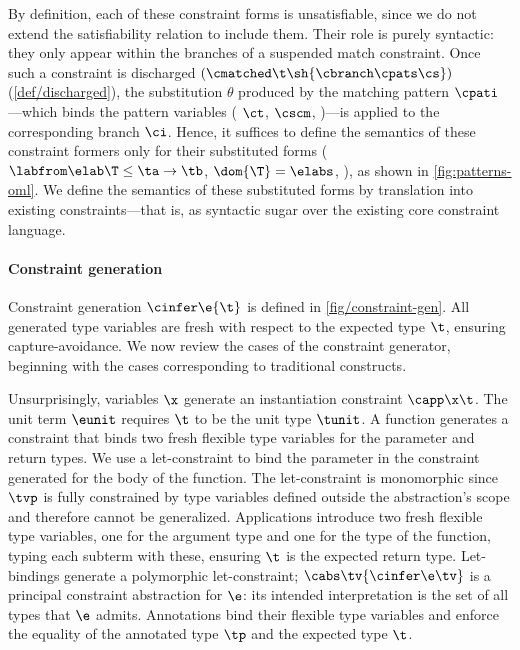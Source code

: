 \documentclass[acmsmall,screen,nonacm%
\Anonymous{,anonymous}{}%
\Final{}{,review}%
]{acmart}
\begin{document}
By definition, each of these constraint forms is unsatisfiable, since we do not
extend the satisfiability relation to include them. Their role is purely
syntactic: they only appear within the branches of a suspended match
constraint. Once such a constraint is discharged $(\cmatched \t \sh {\cbranch
\cpats \cs})$ (\cref {def/discharged}), the substitution $\theta$ produced by
the matching pattern $\cpati$---which binds the pattern variables (\eg
$\ct$, $\cscm$, \etc)---is
applied to the corresponding branch $\ci$. Hence, it suffices to define
the semantics of these constraint formers only for their substituted forms (\eg
$\labfrom \elab \T \leq \ta \to \tb$, $\dom {\T} = \elabs$, \etc), as shown in
\cref{fig:patterns-oml}. We define the semantics of these substituted forms by
translation into existing constraints---that is, as syntactic sugar over the
existing core constraint language.

\paragraph{Constraint generation}

Constraint generation $\cinfer \e {\mathop{\t}}$ is defined in
\cref{fig/constraint-gen}. All generated type variables are fresh with respect
to the expected type $\t$, ensuring capture-avoidance. We now review the cases
of the constraint generator, beginning with the cases corresponding to
traditional \ML constructs.


Unsurprisingly, variables $\x$ generate an instantiation constraint $\capp \x
\t$. The unit term $\eunit$ requires $\t$ to be the unit type $\tunit$. A
function generates a constraint that binds two fresh flexible type variables
for the parameter and return types.  We use a let-constraint to bind the
parameter in the constraint generated for the body of the function. The
let-constraint is monomorphic since $\tvp$ is fully constrained by type
variables defined outside the abstraction's scope and therefore cannot be
generalized. Applications introduce two fresh flexible type variables, one for
the argument type and one for the type of the function, typing each subterm
with these, ensuring $\t$ is the expected return type. Let-bindings generate a
polymorphic let-constraint; $\cabs \tv {\cinfer \e \tv}$ is a principal
constraint abstraction for $\e$: its intended interpretation is the set of all
types that $\e$ admits. Annotations bind their flexible type variables and
enforce the equality of the annotated type $\tp$ and the expected type $\t$.
\end{document}

